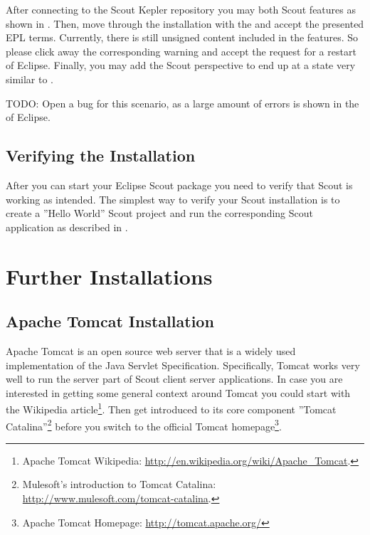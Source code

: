 \documentclass[a4paper,10pt,twoside]{book}
\begin{document}
After connecting to the Scout Kepler repository you may both Scout features as shown in .
Then, move through the installation with the  and accept the presented EPL terms.
Currently, there is still unsigned content included in the features.
So please click away the corresponding warning and accept the request for a restart of Eclipse.
Finally, you may add the Scout perspective to end up at a state very similar to .

TODO: Open a bug for this scenario, as a large amount of errors is shown in the  of Eclipse.


\section{Verifying the Installation}

After you can start your Eclipse Scout package you need to verify that Scout is working as intended.
The simplest way to verify your Scout installation is to create a ''Hello World'' Scout project and run the corresponding Scout application as described in .

\chapter{Further Installations}

\section{Apache Tomcat Installation}

Apache Tomcat is an open source web server that is a widely used implementation of the Java Servlet Specification.
Specifically, Tomcat works very well to run the server part of Scout client server applications.
In case you are interested in getting some general context around Tomcat you could start with the Wikipedia article\footnote{
Apache Tomcat Wikipedia: \url{http://en.wikipedia.org/wiki/Apache_Tomcat}.
}.
Then get introduced to its core component ''Tomcat Catalina''\footnote{
Mulesoft's introduction to Tomcat Catalina: \url{http://www.mulesoft.com/tomcat-catalina}.
}
before you switch to the official Tomcat homepage\footnote{
Apache Tomcat Homepage: \url{http://tomcat.apache.org/}
}.
\end{document}
